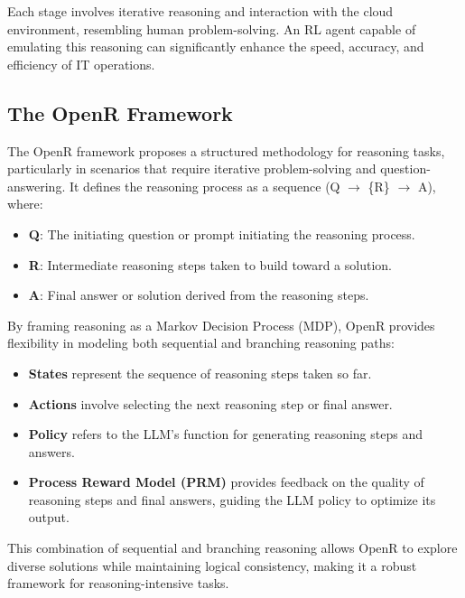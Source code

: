 \documentclass[conference]{IEEEtran}
\begin{document}
Each stage involves iterative reasoning and interaction with the cloud environment, resembling human problem-solving. An RL agent capable of emulating this reasoning can significantly enhance the speed, accuracy, and efficiency of IT operations.

\subsection{The OpenR Framework}
The OpenR framework proposes a structured methodology for reasoning tasks, particularly in scenarios that require iterative problem-solving and question-answering. It defines the reasoning process as a sequence (Q $\rightarrow$ \{R\} $\rightarrow$ A), where:
\begin{itemize}
    \item \textbf{Q}: The initiating question or prompt initiating the reasoning process.
    \item \textbf{R}: Intermediate reasoning steps taken to build toward a solution.
    \item \textbf{A}: Final answer or solution derived from the reasoning steps.
\end{itemize}

By framing reasoning as a Markov Decision Process (MDP), OpenR provides flexibility in modeling both sequential and branching reasoning paths:
\begin{itemize}
    \item \textbf{States} represent the sequence of reasoning steps taken so far.
    \item \textbf{Actions} involve selecting the next reasoning step or final answer.
    \item \textbf{Policy} refers to the LLM's function for generating reasoning steps and answers.
    \item \textbf{Process Reward Model (PRM)} provides feedback on the quality of reasoning steps and final answers, guiding the LLM policy to optimize its output.
\end{itemize}

This combination of sequential and branching reasoning allows OpenR to explore diverse solutions while maintaining logical consistency, making it a robust framework for reasoning-intensive tasks.
\end{document}
